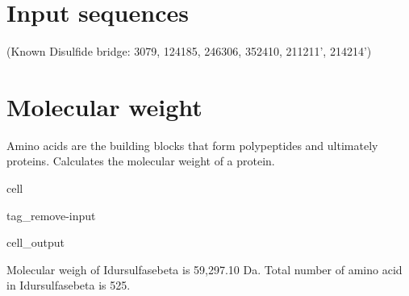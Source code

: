 \documentclass[letterpaper,10pt,english]{jupyterBook}
\begin{document}
\section{Input sequences}
\label{\detokenize{ipynb/chapter1:input-sequences}}
\begin{sphinxVerbatim}[commandchars=\\\{\}]
     
     
     
     
     
     
     
 
\end{sphinxVerbatim}

\sphinxAtStartPar
(Known Disulfide bridge: 30\sphinxhyphen{}79, 124\sphinxhyphen{}185, 246\sphinxhyphen{}306, 352\sphinxhyphen{}410, 211\sphinxhyphen{}211’, 214\sphinxhyphen{}214’)


\section{Molecular weight}
\label{\detokenize{ipynb/chapter1:molecular-weight}}
\sphinxAtStartPar
Amino acids are the building blocks that form polypeptides and ultimately proteins. Calculates the molecular weight of a protein.

\begin{sphinxuseclass}{cell}
\begin{sphinxuseclass}{tag_remove-input}\begin{sphinxVerbatimOutput}

\begin{sphinxuseclass}{cell_output}
\begin{sphinxVerbatim}[commandchars=\\\{\}]
Molecular weigh of Idursulfasebeta is 59,297.10 Da.
Total number of amino acid in Idursulfasebeta is 525.
\end{sphinxVerbatim}

\end{sphinxuseclass}\end{sphinxVerbatimOutput}

\end{sphinxuseclass}
\end{sphinxuseclass}
\end{document}

